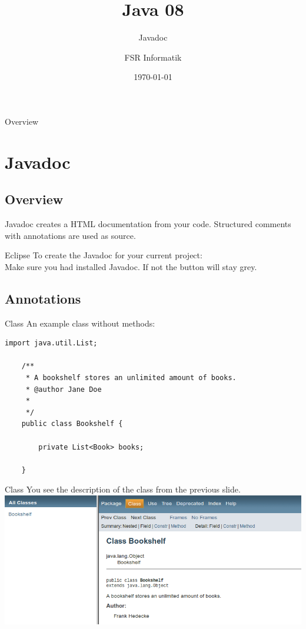 

\title{Java 08}
\subtitle{Javadoc}
\author{FSR Informatik}
\date{\today}



\begin{frame}
\titlepage
\end{frame}
\begin{frame}{Overview}
\tableofcontents
\end{frame}

\section{Javadoc}
\subsection{Overview}
\begin{frame}{}
	Javadoc creates a HTML documentation from your code.
	\vfill
	Structured comments with annotations are used as source.
\end{frame}

\begin{frame}{Eclipse}
	To create the Javadoc for your current project: \\
	\vfill
	Make sure you had installed Javadoc. 
	If not the  button will stay grey.
\end{frame}

\subsection{Annotations}
\begin{frame}[fragile]{Class}
	An example class without methods:
	\begin{lstlisting}[basicstyle=\ttfamily\scriptsize, escapechar=!,
	commentstyle=\color{lightblue}]
    import java.util.List;

    /**
     * A bookshelf stores an unlimited amount of books.
     * @author Jane Doe
     *
     */
    public class Bookshelf {
    
	    private List<Book> books;

    }
	\end{lstlisting}
\end{frame}

\begin{frame}{Class}
	You see the description of the class from the previous slide.
	\vfill
	\includegraphics[scale=0.3]{res/javadoc_class.png}
\end{frame}

